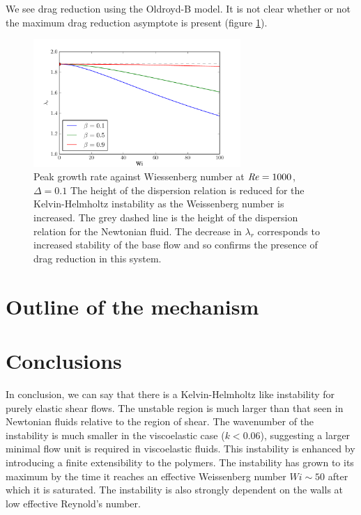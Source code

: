 \documentclass{jfm}
\newcommand\Rey{\mbox{\textit{Re}}}  %
\begin{document}
We see drag reduction using the Oldroyd-B model. It is not clear whether or not
the maximum drag reduction asymptote is present (figure
\ref{fig:KH_drag_reduction}).



\begin{figure}
    \centering
    \includegraphics[width=0.7\textwidth]{KH_high_Re_vary_Wi}
    \caption{
	Peak growth rate against Wiessenberg number at $\Rey = 1000$, $\Delta =
	0.1$ The height of the dispersion relation is reduced for the
	Kelvin-Helmholtz instability as the Weissenberg number is increased.
	The grey dashed line is the height of the dispersion relation for the
	Newtonian fluid. The decrease in $\lambda_{r}$ corresponds to increased
	stability of the base flow and so confirms the presence of drag
	reduction in this system.
    }
    \label{fig:KH_drag_reduction}
\end{figure}

\section{Outline of the mechanism}

\section{Conclusions}

In conclusion, we can say that there is a Kelvin-Helmholtz like instability for
purely elastic shear flows. The unstable region is much larger than that seen
in Newtonian fluids relative to the region of shear. The wavenumber of the
instability is much smaller in the viscoelastic case ($k<0.06$), suggesting a
larger minimal flow unit is required in viscoelastic fluids. This instability
is enhanced by introducing a finite extensibility to the polymers. The
instability has grown to its maximum by the time it reaches an effective
Weissenberg number $ Wi \sim 50$ after which it is saturated. The instability
is also strongly dependent on the walls at low effective Reynold's number.





\end{document}

